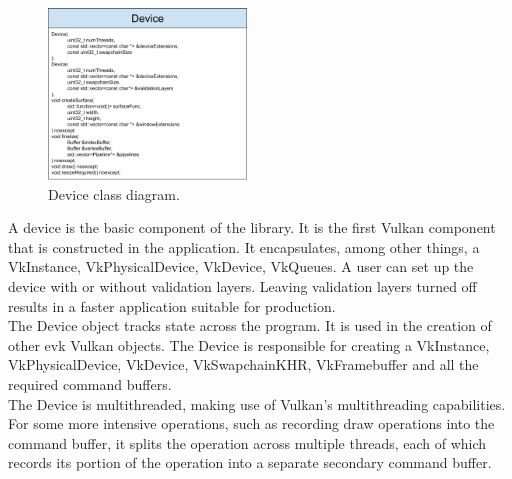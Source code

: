 \documentclass[12pt]{report}
\newcommand{\figurewidth}{0.55\textwidth}
\newcommand{\imagewidth}{0.47\textwidth}
\theoremstyle{definition}
\begin{document}
        \begin{figure}
          \centering
          \includegraphics[width=\imagewidth]{images/class_device.png}
          \caption{Device class diagram.}
          \label{fig:class_device}  
        \end{figure}

        A device is the basic component of the library. It is the first Vulkan
        component that is constructed in the application. It encapsulates,
        among other things, a VkInstance, VkPhysicalDevice, VkDevice, VkQueues.
        A user can set up the device with or without validation layers. Leaving
        validation layers turned off results in a faster application suitable
        for production. \\

        The Device object tracks state across the program. It is used in the
        creation of other evk Vulkan objects. The Device is responsible for
        creating a VkInstance, VkPhysicalDevice, VkDevice, VkSwapchainKHR, VkFramebuffer
        and all the required command buffers. \\

        The Device is multithreaded, making use of Vulkan's multithreading
        capabilities. For some more intensive operations, such as recording
        draw operations into the command buffer, it splits the operation
        across multiple threads, each of which records its portion of the
        operation into a separate secondary command buffer. \\
\end{document}
